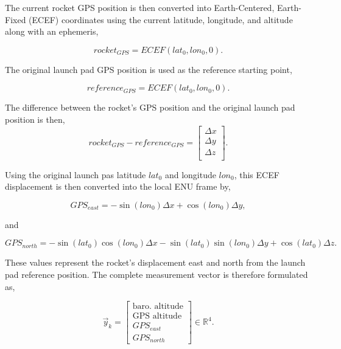 \documentclass{article}
\begin{document}
The current rocket GPS position is then converted into Earth-Centered, Earth-Fixed (ECEF) coordinates using the current latitude, longitude, and altitude along with an ephemeris, 


    
\begin{equation}
  {rocket}_{GPS} = ECEF(lat_0, lon_0, 0).
\end{equation}

The original launch pad GPS position is used as the reference starting point, 

\begin{equation}
  {reference}_{GPS} = ECEF(lat_0, lon_0, 0).
\end{equation}


The difference between the rocket's GPS position and the original launch pad position is then, 
\begin{equation}
  {rocket}_{GPS} - {reference}_{GPS} = 
\begin{bmatrix}
\Delta x\\
\Delta y\\
\Delta z \\
\end{bmatrix}.  
\end{equation}



Using the original launch pas latitude $lat_0$ and longitude $lon_0$, this ECEF displacement is then converted into the local ENU frame by, 

\begin{equation}
GPS_{east} = -\sin(lon_0)\Delta x
+\cos(lon_0)\Delta y, 
\end{equation}

and 

\begin{equation}
   GPS_{north} = 
-\sin(lat_0)\cos(lon_0)\Delta x
-\sin(lat_0)\sin(lon_0)\Delta y
+\cos(lat_0)\Delta z.
\end{equation}

These values represent the rocket's displacement east and north from the launch pad reference position. The complete measurement vector is therefore formulated as, 

\begin{equation}
    \vec{y}_k =
\begin{bmatrix}
\text{baro. altitude} \\
\text{GPS altitude} \\
\text{$GPS_{east}$} \\
\text{$GPS_{north}$}
\end{bmatrix} \in \mathbb{R}^4 .
\end{equation}
\end{document}
